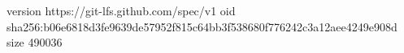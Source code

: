 version https://git-lfs.github.com/spec/v1
oid sha256:b06e6818d3fe9639de57952f815c64bb3f538680f776242c3a12aee4249e908d
size 490036
